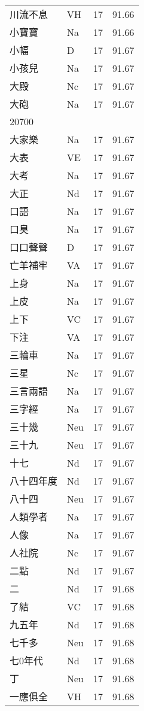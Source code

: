 \documentclass[twocolumn]{book}
\begin{document}
\begin{supertabular}{llrr}
川流不息 & VH & 17 &  91.66\\
小寶寶 & Na & 17 &  91.66\\
小幅 & D & 17 &  91.67\\
小孩兒 & Na & 17 &  91.67\\
大殿 & Nc & 17 &  91.67\\
大砲 & Na & 17 &  91.67\\
20700\\
大家樂 & Na & 17 &  91.67\\
大表 & VE & 17 &  91.67\\
大考 & Na & 17 &  91.67\\
大正 & Nd & 17 &  91.67\\
口語 & Na & 17 &  91.67\\
口臭 & Na & 17 &  91.67\\
口口聲聲 & D & 17 &  91.67\\
亡羊補牢 & VA & 17 &  91.67\\
上身 & Na & 17 &  91.67\\
上皮 & Na & 17 &  91.67\\
上下 & VC & 17 &  91.67\\
下注 & VA & 17 &  91.67\\
三輪車 & Na & 17 &  91.67\\
三星 & Nc & 17 &  91.67\\
三言兩語 & Na & 17 &  91.67\\
三字經 & Na & 17 &  91.67\\
三十幾 & Neu & 17 &  91.67\\
三十九 & Neu & 17 &  91.67\\
十七 & Nd & 17 &  91.67\\
八十四年度 & Nd & 17 &  91.67\\
八十四 & Neu & 17 &  91.67\\
人類學者 & Na & 17 &  91.67\\
人像 & Na & 17 &  91.67\\
人社院 & Nc & 17 &  91.67\\
二點 & Nd & 17 &  91.67\\
二 & Nd & 17 &  91.68\\
了結 & VC & 17 &  91.68\\
九五年 & Nd & 17 &  91.68\\
七千多 & Neu & 17 &  91.68\\
七0年代 & Nd & 17 &  91.68\\
丁 & Neu & 17 &  91.68\\
一應俱全 & VH & 17 &  91.68\\

\end{supertabular}
\end{document}
